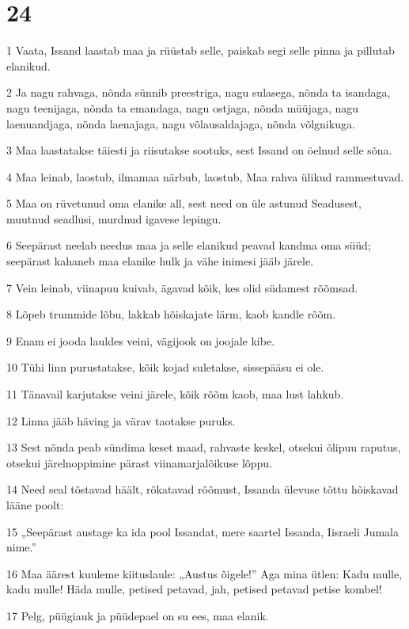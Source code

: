 \chapter{24}

\par 1 Vaata, Issand laastab maa ja rüüstab selle, paiskab segi selle pinna ja pillutab elanikud.
\par 2 Ja nagu rahvaga, nõnda sünnib preestriga, nagu sulasega, nõnda ta isandaga, nagu teenijaga, nõnda ta emandaga, nagu ostjaga, nõnda müüjaga, nagu laenuandjaga, nõnda laenajaga, nagu võlausaldajaga, nõnda võlgnikuga.
\par 3 Maa laastatakse täiesti ja riisutakse sootuks, sest Issand on öelnud selle sõna.
\par 4 Maa leinab, laostub, ilmamaa närbub, laostub, Maa rahva ülikud rammestuvad.
\par 5 Maa on rüvetunud oma elanike all, sest need on üle astunud Seadusest, muutnud seadlusi, murdnud igavese lepingu.
\par 6 Seepärast neelab needus maa ja selle elanikud peavad kandma oma süüd; seepärast kahaneb maa elanike hulk ja vähe inimesi jääb järele.
\par 7 Vein leinab, viinapuu kuivab, ägavad kõik, kes olid südamest rõõmsad.
\par 8 Lõpeb trummide lõbu, lakkab hõiskajate lärm, kaob kandle rõõm.
\par 9 Enam ei jooda lauldes veini, vägijook on joojale kibe.
\par 10 Tühi linn purustatakse, kõik kojad suletakse, sissepääsu ei ole.
\par 11 Tänavail karjutakse veini järele, kõik rõõm kaob, maa lust lahkub.
\par 12 Linna jääb häving ja värav taotakse puruks.
\par 13 Sest nõnda peab sündima keset maad, rahvaste keskel, otsekui õlipuu raputus, otsekui järelnoppimine pärast viinamarjalõikuse lõppu.
\par 14 Need seal tõstavad häält, rõkatavad rõõmust, Issanda ülevuse tõttu hõiskavad lääne poolt:
\par 15 „Seepärast austage ka ida pool Issandat, mere saartel Issanda, Iisraeli Jumala nime.”
\par 16 Maa äärest kuuleme kiituslaule: „Austus õigele!” Aga mina ütlen: Kadu mulle, kadu mulle! Häda mulle, petised petavad, jah, petised petavad petise kombel!
\par 17 Pelg, püügiauk ja püüdepael on su ees, maa elanik.
